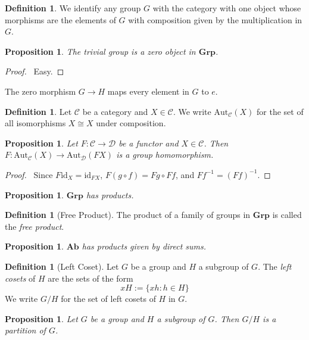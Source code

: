 \documentclass{book}
\let\qed\relax
\newtheorem{prop}[ax]{Proposition}
\theoremstyle{definition}
\newtheorem{df}[ax]{Definition}
\newcommand{\id}[1]{\ensuremath{\mathrm{id}_{#1}}}
\newcommand{\inv}[1]{\ensuremath{{#1}^{-1}}}
\begin{document}
\begin{df}
We identify any group $G$ with the category with one object whose morphisms are the elements of $G$ with composition given by the multiplication in $G$.
\end{df}

\begin{prop}
The trivial group is a zero object in $\mathbf{Grp}$.
\end{prop}

\begin{proof}
\pf\ Easy. \qed
\end{proof}

The zero morphism $G \rightarrow H$ maps every element in $G$ to $e$.

\begin{df}
Let $\mathcal{C}$ be a category and $X \in \mathcal{C}$. We write $\mathrm{Aut}_\mathcal{C}(X)$ for the set of all isomorphisms $X \cong X$ under composition.
\end{df}

\begin{prop}
Let $F : \mathcal{C} \rightarrow \mathcal{D}$ be a functor and $X \in \mathcal{C}$. Then $F : \mathrm{Aut}_\mathcal{C}(X) \rightarrow \mathrm{Aut}_\mathcal{D}(FX)$ is a group homomorphism.
\end{prop}

\begin{proof}
\pf\ Since $F \id{X} = \id{FX}$, $F(g \circ f) = Fg \circ Ff$, and $F \inv{f} = \inv{(Ff)}$. \qed
\end{proof}

\begin{prop}
$\mathbf{Grp}$ has products.
\end{prop}

\begin{df}[Free Product]
The product of a family of groups in $\mathbf{Grp}$ is called the \emph{free product}.
\end{df}

\begin{prop}
$\mathbf{Ab}$ has products given by direct sums.
\end{prop}

\begin{df}[Left Coset]
Let $G$ be a group and $H$ a subgroup of $G$. The \emph{left cosets} of $H$ are the sets of the form
\[ xH := \{ xh : h \in H \} \]
We write $G/H$ for the set of left cosets of $H$ in $G$.
\end{df}

\begin{prop}
Let $G$ be a group and $H$ a subgroup of $G$. Then $G/H$ is a partition of $G$.
\end{prop}
\end{document}
